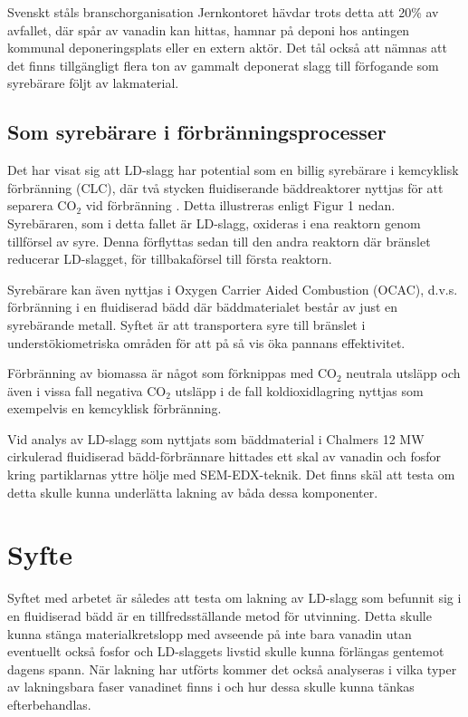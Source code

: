 \documentclass{article}
\begin{document}
Svenskt ståls branschorganisation Jernkontoret hävdar trots detta att 20\% av avfallet, där spår av vanadin kan hittas, hamnar på deponi hos antingen kommunal deponeringsplats eller en extern aktör\cite{PontusWestrin}. Det tål också att nämnas att det finns tillgängligt flera ton av gammalt deponerat slagg till förfogande som syrebärare följt av lakmaterial. %


\subsection{Som syrebärare i förbränningsprocesser}
Det har visat sig att LD-slagg har potential som en billig syrebärare i kemcyklisk förbränning (CLC), där två stycken fluidiserande bäddreaktorer nyttjas för att separera CO$_2$ vid förbränning \cite{Xu2017}. Detta illustreras enligt Figur 1 %
nedan. Syrebäraren, som i detta fallet är LD-slagg, oxideras i ena reaktorn genom tillförsel av syre. Denna förflyttas sedan till den andra reaktorn där bränslet reducerar LD-slagget, för tillbakaförsel till första reaktorn.  %
 
Syrebärare kan även nyttjas i Oxygen Carrier Aided Combustion (OCAC), d.v.s. förbränning i en fluidiserad bädd där bäddmaterialet består av just en syrebärande metall.
Syftet är att transportera syre till bränslet i understökiometriska områden för att på så vis öka pannans effektivitet\cite{Zevenhoven2018}.
 
 Förbränning av biomassa är något som förknippas med CO$_2$ neutrala utsläpp och även i vissa fall negativa CO$_2$ utsläpp i de fall koldioxidlagring nyttjas som exempelvis en kemcyklisk förbränning\cite{Zevenhoven2018}.

Vid analys av LD-slagg som nyttjats som bäddmaterial i Chalmers 12 MW cirkulerad fluidiserad bädd-förbrännare hittades ett skal av vanadin och fosfor kring partiklarnas yttre hölje med SEM-EDX-teknik. Det finns skäl att testa om detta skulle kunna underlätta lakning av båda dessa komponenter.

\section{Syfte}
Syftet med arbetet är således att testa om lakning av LD-slagg som befunnit sig i en fluidiserad bädd är en tillfredsställande metod för utvinning. Detta skulle kunna stänga materialkretslopp med avseende på inte bara vanadin utan eventuellt också fosfor och LD-slaggets livstid skulle kunna förlängas gentemot dagens spann. När lakning har utförts kommer det också analyseras i vilka typer av lakningsbara faser vanadinet finns i och hur dessa skulle kunna tänkas efterbehandlas. 
\end{document}
